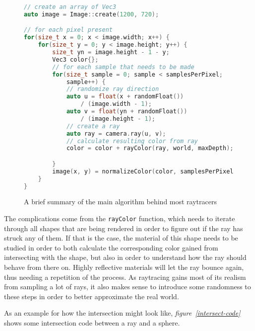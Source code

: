 \begin{figure}[H]
	\begin{center}
		\begin{lstlisting}[language=C++]
// create an array of Vec3
auto image = Image::create(1200, 720);

// for each pixel present
for(size_t x = 0; x < image.width; x++) {
	for(size_t y = 0; y < image.height; y++) {
		size_t yn = image.height - 1 - y;
		Vec3 color{};
		// for each sample that needs to be made
		for(size_t sample = 0; sample < samplesPerPixel; 
			sample++) {
			// randomize ray direction
			auto u = float(x + randomFloat()) 
				/ (image.width - 1);
			auto v = float(yn + randomFloat()) 
				/ (image.height - 1);
			// create a ray
			auto ray = camera.ray(u, v);
			// calculate resulting color from ray
			color = color + rayColor(ray, world, maxDepth);

		}
		image(x, y) = normalizeColor(color, samplesPerPixel);
	}
}
		\end{lstlisting}
		\caption{A brief summary of the main algorithm behind most raytracers}
		\label{raytrace-code}
	\end{center}
\end{figure}

The complications come from the \lstinline{rayColor} function, which needs to iterate through all shapes that are being rendered in order to figure out if the ray has struck any of them. If that is the case, the material of this shape needs to be studied in order to both calculate the corresponding color gained from intersecting with the shape, but also in order to understand how the ray should behave from there on. Highly reflective materials will let the ray bounce again, thus needing a repetition of the process. As raytracing gains most of its realism from sampling a lot of rays, it also makes sense to introduce some randomness to these steps in order to better approximate the real world.

As an example for how the intersection might look like, \textit{figure~\ref{intersect-code}} shows some intersection code between a ray and a sphere.

